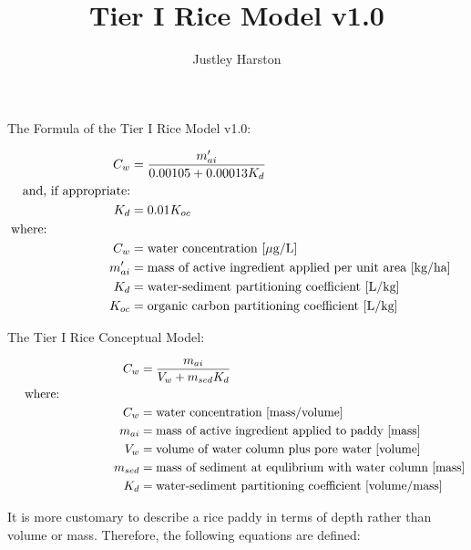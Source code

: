 \documentclass[12pt, A4]{article}
\begin{document}
\title{Tier I Rice Model v1.0}

\author{Justley Harston}


\maketitle


The Formula of the Tier I Rice Model v1.0:

\begin{align}
C_w & = \frac{m_{ai}^\prime}{0.00105 + 0.00013K_d} \nonumber \\
\text{and, if appropriate:} \nonumber \\
K_d & = 0.01K_{oc} \nonumber \\
&    \hspace{-1.3in}  \text{where:} \nonumber \\
C_w & = \text{water concentration [$\mu$g/L]}  \nonumber \\
m_{ai}^\prime & = \text{mass of active ingredient applied per unit area [kg/ha]}  \nonumber \\
K_d & = \text{water-sediment partitioning coefficient [L/kg]} \nonumber \\
K_{oc} & = \text{organic carbon partitioning coefficient [L/kg]} \nonumber
\end{align} 

The Tier I Rice Conceptual Model:

\begin{align}
 \hspace{1.3in} C_w & = \frac{m_{ai}}{V_w + m_{sed}K_d}  \\
  &    \hspace{-1.3in}  \text{where:} \nonumber \\
C_w & = \text{water concentration [mass/volume]}  \nonumber \\
m_{ai} & = \text{mass of active ingredient applied to paddy [mass]}  \nonumber \\
V_w & = \text{volume of water column plus pore water [volume]}  \nonumber \\
m_{sed} & = \text{mass of sediment at equlibrium with water column [mass]} \nonumber \\
K_d & = \text{water-sediment partitioning coefficient [volume/mass]} \nonumber 
\end{align}

It is more customary to describe a rice paddy in terms of depth rather than volume or mass. Therefore, the following equations are defined:
\end{document}
